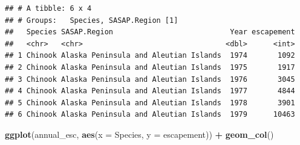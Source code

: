 \documentclass[]{article}
\newenvironment{Shaded}{\begin{snugshade}}{\end{snugshade}}
\newcommand{\DataTypeTok}[1]{\textcolor[rgb]{0.13,0.29,0.53}{#1}}
\newcommand{\KeywordTok}[1]{\textcolor[rgb]{0.13,0.29,0.53}{\textbf{#1}}}
\newcommand{\NormalTok}[1]{#1}
\newcommand{\OperatorTok}[1]{\textcolor[rgb]{0.81,0.36,0.00}{\textbf{#1}}}
\newcommand{\StringTok}[1]{\textcolor[rgb]{0.31,0.60,0.02}{#1}}
\begin{document}
\begin{Shaded}
\end{Shaded}

\begin{verbatim}
## # A tibble: 6 x 4
## # Groups:   Species, SASAP.Region [1]
##   Species SASAP.Region                           Year escapement
##   <chr>   <chr>                                 <dbl>      <int>
## 1 Chinook Alaska Peninsula and Aleutian Islands  1974       1092
## 2 Chinook Alaska Peninsula and Aleutian Islands  1975       1917
## 3 Chinook Alaska Peninsula and Aleutian Islands  1976       3045
## 4 Chinook Alaska Peninsula and Aleutian Islands  1977       4844
## 5 Chinook Alaska Peninsula and Aleutian Islands  1978       3901
## 6 Chinook Alaska Peninsula and Aleutian Islands  1979      10463
\end{verbatim}

\begin{Shaded}
\begin{Highlighting}[]
\KeywordTok{ggplot}\NormalTok{(annual_esc, }\KeywordTok{aes}\NormalTok{(}\DataTypeTok{x =}\NormalTok{ Species, }\DataTypeTok{y =}\NormalTok{ escapement)) }\OperatorTok{+}
\StringTok{  }\KeywordTok{geom_col}\NormalTok{()}
\end{Highlighting}
\end{Shaded}
\end{document}
